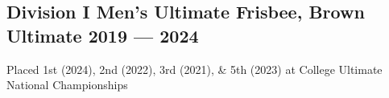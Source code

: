 \subsection{Division I Men's Ultimate Frisbee, Brown Ultimate	\hfill 2019 --- 2024}
\begin{zitemize}
\item Placed 1st (2024), 2nd (2022), 3rd (2021), \& 5th (2023) at College Ultimate National Championships
\end{zitemize}